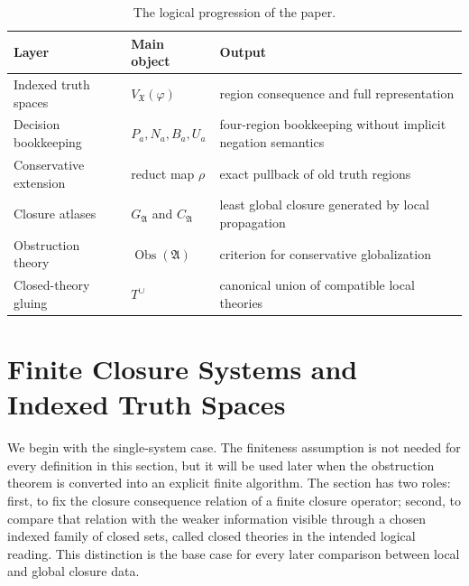 \documentclass[11pt]{amsart}
\numberwithin{equation}{section}
\theoremstyle{plain}
\theoremstyle{definition}
\theoremstyle{remark}
\begin{document}
\begin{table}[htbp]
\centering
\renewcommand{\arraystretch}{1.15}
\begin{tabular}{@{}p{}p{}p{}@{}}
\toprule
Layer & Main object & Output \\
\midrule
Indexed truth spaces
& \(V_{\mathfrak X}(\varphi)\)
& region consequence and full representation \\

Decision bookkeeping
& \(P_a,N_a,B_a,U_a\)
& four-region bookkeeping without implicit negation semantics \\

Conservative extension
& reduct map \(\rho\)
& exact pullback of old truth regions \\

Closure atlases
& \(G_{\mathfrak A}\) and \(C_{\mathfrak A}\)
& least global closure generated by local propagation \\

Obstruction theory
& \(\operatorname{Obs}(\mathfrak A)\)
& criterion for conservative globalization \\

Closed-theory gluing
& \(T^\cup\)
& canonical union of compatible local theories \\
\bottomrule
\end{tabular}
\caption{The logical progression of the paper.}
\label{tab:paper-roadmap}
\end{table}

\section{Finite Closure Systems and Indexed Truth Spaces}
\label{sec:finite-closure-systems}

We begin with the single-system case.  The finiteness assumption is not needed for every definition in this section, but it will be used later when the obstruction theorem is converted into an explicit finite algorithm.  The section has two roles: first, to fix the closure consequence relation of a finite closure operator; second, to compare that relation with the weaker information visible through a chosen indexed family of closed sets, called closed theories in the intended logical reading.  This distinction is the base case for every later comparison between local and global closure data.
\end{document}
